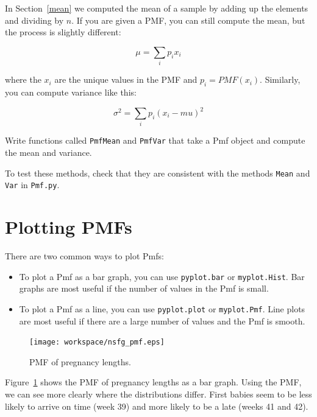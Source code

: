 \documentclass[12pt]{book}
\begin{document}
\begin{ex}

In Section~\ref{mean} we computed the mean of a sample by adding up
the elements and dividing by $n$.  If you are given a PMF, you can
still compute the mean, but the process is slightly different:

\[ \mu = \sum_i p_i x_i \]

where the $x_i$ are the unique values in the PMF and $p_i = PMF(x_i)$.
Similarly, you can compute variance like this:

\[ \sigma^2 = \sum_i p_i (x_i - mu)^2\]

Write functions called {\tt PmfMean} and {\tt PmfVar} that take a Pmf
object and compute the mean and variance.

To test these methods, check that they are consistent with the
methods {\tt Mean} and {\tt Var} in {\tt Pmf.py}.
\end{ex}




\section{Plotting PMFs}

There are two common ways to plot Pmfs:

\begin{itemize}

\item To plot a Pmf as a bar graph, you can use {\tt pyplot.bar}
or {\tt myplot.Hist}.  Bar graphs are most useful if the number
of values in the Pmf is small.

\item To plot a Pmf as a line, you can use {\tt pyplot.plot}
or {\tt myplot.Pmf}.  Line plots are most useful if there are
a large number of values and the Pmf is smooth.

\end{itemize}

\begin{figure}
\centerline{\texttt{[image: workspace/nsfg\_pmf.eps]}}
\caption{PMF of pregnancy lengths.}
\label{nsfg_pmf}
\end{figure}

Figure~\ref{nsfg_pmf} shows the PMF of pregnancy lengths as a bar
graph.  Using the PMF, we can see more clearly where the distributions
differ.  First babies seem to be less likely to arrive on time (week
39) and more likely to be a late (weeks 41 and 42).
\end{document}
